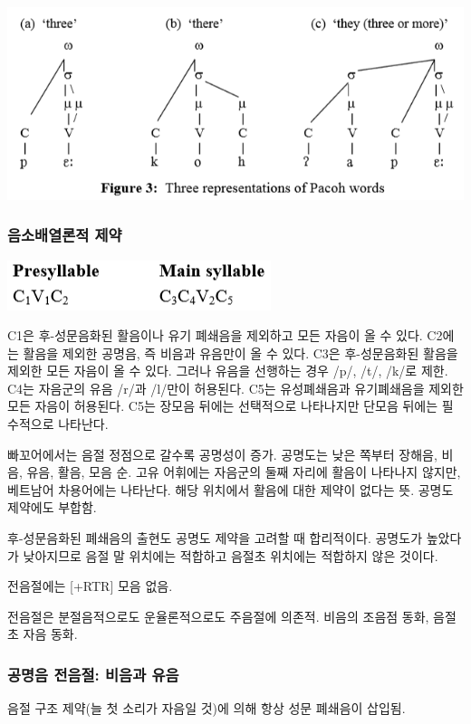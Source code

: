 \begin{center}
\includegraphics{Pacoh/src/PacohFigure3.png}
\end{center}

\subsubsection{음소배열론적 제약}
\includegraphics{Pacoh/src/Pacohsyllablestructure.png}

C1은 후-성문음화된 활음이나 유기 폐쇄음을 제외하고 모든 자음이 올 수 있다. C2에는 활음을 제외한 공명음, 즉 비음과 유음만이 올 수 있다. C3은 후-성문음화된 활음을 제외한 모든 자음이 올 수 있다. 그러나 유음을 선행하는 경우 /p/, /t/, /k/로 제한. C4는 자음군의 유음 /r/과 /l/만이 허용된다. C5는 유성폐쇄음과 유기폐쇄음을 제외한 모든 자음이 허용된다. C5는 장모음 뒤에는 선택적으로 나타나지만 단모음 뒤에는 필수적으로 나타난다.

빠꼬어에서는 음절 정점으로 갈수록 공명성이 증가. 공명도는 낮은 쪽부터 장해음, 비음, 유음, 활음, 모음 순. 고유 어휘에는 자음군의 둘째 자리에 활음이 나타나지 않지만, 베트남어 차용어에는 나타난다. 해당 위치에서 활음에 대한 제약이 없다는 뜻. 공명도 제약에도 부합함.

후-성문음화된 폐쇄음의 출현도 공명도 제약을 고려할 때 합리적이다. 공명도가 높았다가 낮아지므로 음절 말 위치에는 적합하고 음절초 위치에는 적합하지 않은 것이다.

전음절에는 [+RTR] 모음 없음. 

전음절은 분절음적으로도 운율론적으로도 주음절에 의존적. 비음의 조음점 동화, 음절초 자음 동화.

\subsubsection{공명음 전음절: 비음과 유음}
음절 구조 제약(늘 첫 소리가 자음일 것)에 의해 항상 성문 폐쇄음이 삽입됨.

